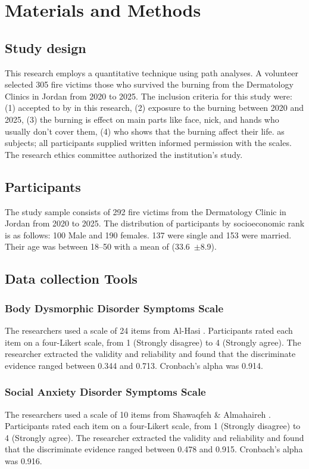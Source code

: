 \documentclass{NSP1}
\begin{document}
\section{Materials and Methods}
\subsection{Study design}
This research employs a quantitative technique using path analyses. A volunteer selected 305 fire victims those who survived the burning from the Dermatology Clinics in Jordan from 2020 to 2025. The inclusion criteria for this study were: (1) accepted to by in this research, (2) exposure to the burning between 2020 and 2025, (3) the burning is effect on main parts like face, nick, and hands who usually don't cover them, (4) who shows that the burning affect their life. as subjects; all participants supplied written informed permission with the scales. The research ethics committee authorized the institution's study.

\subsection{Participants}
The study sample consists of 292 fire victims from the Dermatology Clinic in Jordan from 2020 to 2025. The distribution of participants by socioeconomic rank is as follows: 100 Male and 190 females. 137 were single and 153 were married. Their age was between 18--50 with a mean of (33.6~$\pm$8.9).

\subsection{Data collection Tools}
\subsubsection{Body Dysmorphic Disorder Symptoms Scale}
The researchers used a scale of 24 items from Al-Hasi \cite{AlHasi2023}. Participants rated each item on a four-Likert scale, from 1 (Strongly disagree) to 4 (Strongly agree). The researcher extracted the validity and reliability and found that the discriminate evidence ranged between 0.344 and 0.713. Cronbach's alpha was 0.914.

\subsubsection{Social Anxiety Disorder Symptoms Scale}
The researchers used a scale of 10 items from Shawaqfeh \& Almahaireh \cite{Shawaqfeh2022}. Participants rated each item on a four-Likert scale, from 1 (Strongly disagree) to 4 (Strongly agree). The researcher extracted the validity and reliability and found that the discriminate evidence ranged between 0.478 and 0.915. Cronbach's alpha was 0.916.
\end{document}
